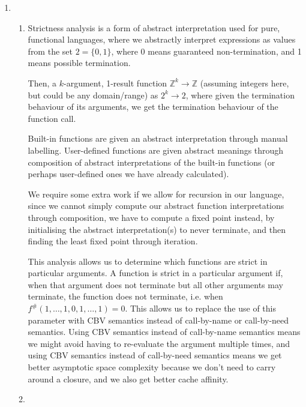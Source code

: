 


\begin{enumerate}[label=(\alph*)]

  \item

    \begin{enumerate}[label=(\roman*)]

      \item

        Strictness analysis is a form of abstract interpretation used for pure, functional languages, where we abstractly interpret expressions as values from the set $2 = \{0,1\}$, where 0 means guaranteed non-termination, and 1 means possible termination.

        Then, a $k$-argument, 1-result function $\mathbb{Z}^k \rightarrow \mathbb{Z}$ (assuming integers here, but could be any domain/range) as $2^k \rightarrow 2$, where given the termination behaviour of its arguments, we get the termination behaviour of the function call.

        Built-in functions are given an abstract interpretation through manual labelling. User-defined functions are given abstract meanings through composition of abstract interpretations of the built-in functions (or perhaps user-defined ones we have already calculated).

        We require some extra work if we allow for recursion in our language, since we cannot simply compute our abstract function interpretations through composition, we have to compute a fixed point instead, by initialising the abstract interpretation(s) to never terminate, and then finding the least fixed point through iteration.

        This analysis allows us to determine which functions are strict in particular arguments. A function is strict in a particular argument if, when that argument does not terminate but all other arguments may terminate, the function does not terminate, i.e. when $f^{\#}(1,\ldots,1,0,1,\ldots,1) = 0$. This allows us to replace the use of this parameter with CBV semantics instead of call-by-name or call-by-need semantics. Using CBV semantics instead of call-by-name semantics means we might avoid having to re-evaluate the argument multiple times, and using CBV semantics instead of call-by-need semantics means we get better asymptotic space complexity because we don't need to carry around a closure, and we also get better cache affinity.

        \item
          \begin{enumerate}[label=(\roman*)]


\end{enumerate}
\end{enumerate}
\end{enumerate}
